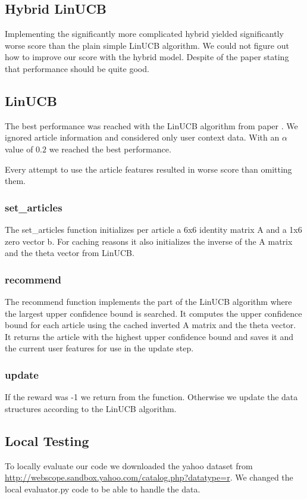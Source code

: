 \documentclass[a4paper, 11pt]{article}
\begin{document}
\subsection{Hybrid LinUCB}
Implementing the significantly more complicated hybrid yielded significantly worse score than the plain simple LinUCB algorithm. We could not figure out how to improve our score with the hybrid model. Despite of the paper stating that performance should be quite good.

\subsection{LinUCB}
The best performance was reached with the LinUCB algorithm from paper \cite{li2010contextual}. We ignored article information and considered only user context data. With an $\alpha$ value of $0.2$ we reached the best performance. 

Every attempt to use the article features resulted in worse score than omitting them.

\subsubsection{set\_articles}
The set\_articles function initializes per article a 6x6 identity matrix A and a 1x6 zero vector b. For caching reasons it also initializes the inverse of the A matrix and the theta vector from LinUCB.

\subsubsection{recommend}
The recommend function implements the part of the LinUCB algorithm where the largest upper confidence bound is searched. It computes the upper confidence bound for each article using the cached inverted A matrix and the theta vector.
It returns the article with the highest upper confidence bound and saves it and the current user features for use in the update step.

\subsubsection{update}
If the reward was -1 we return from the function. Otherwise we update the data structures according to the LinUCB algorithm.

\subsection{Local Testing}
To locally evaluate our code we downloaded the yahoo dataset from \url{http://webscope.sandbox.yahoo.com/catalog.php?datatype=r}. We changed the local evaluator.py code to be able to handle the data.
\end{document}
